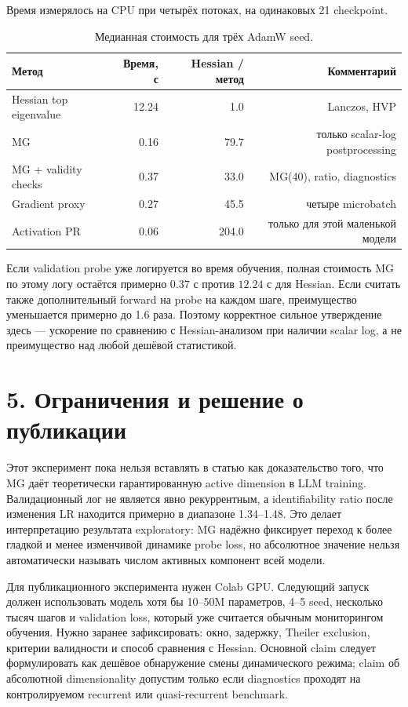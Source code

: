 \documentclass[10pt,a4paper]{article}
\begin{document}
Время измерялось на CPU при четырёх потоках, на одинаковых 21 checkpoint.

\begin{table}[h]
\centering\small
\caption{Медианная стоимость для трёх AdamW seed.}
\begin{tabular}{lrrr}
\toprule
Метод & Время, с & Hessian / метод & Комментарий \\
\midrule
Hessian top eigenvalue & 12.24 & 1.0 & Lanczos, HVP \\
MG & 0.16 & 79.7 & только scalar-log postprocessing \\
MG + validity checks & 0.37 & 33.0 & MG(40), ratio, diagnostics \\
Gradient proxy & 0.27 & 45.5 & четыре microbatch \\
Activation PR & 0.06 & 204.0 & только для этой маленькой модели \\
\bottomrule
\end{tabular}
\end{table}

Если validation probe уже логируется во время обучения, полная стоимость MG по этому
логу остаётся примерно $0.37$ с против $12.24$ с для Hessian. Если считать также
дополнительный forward на probe на каждом шаге, преимущество уменьшается примерно до
1.6 раза. Поэтому корректное сильное утверждение здесь --- ускорение по сравнению с
Hessian-анализом при наличии scalar log, а не преимущество над любой дешёвой статистикой.

\section*{5. Ограничения и решение о публикации}

Этот эксперимент пока нельзя вставлять в статью как доказательство того, что MG даёт
теоретически гарантированную active dimension в LLM training. Валидационный лог не
является явно рекуррентным, а identifiability ratio после изменения LR находится
примерно в диапазоне 1.34--1.48. Это делает интерпретацию результата exploratory:
MG надёжно фиксирует переход к более гладкой и менее изменчивой динамике probe loss,
но абсолютное значение нельзя автоматически называть числом активных компонент всей
модели.

Для публикационного эксперимента нужен Colab GPU. Следующий запуск должен использовать
модель хотя бы 10--50M параметров, 4--5 seed, несколько тысяч шагов и validation loss,
который уже считается обычным мониторингом обучения. Нужно заранее зафиксировать:
окно, задержку, Theiler exclusion, критерии валидности и способ сравнения с Hessian.
Основной claim следует формулировать как дешёвое обнаружение смены динамического режима;
claim об абсолютной dimensionality допустим только если diagnostics проходят на
контролируемом recurrent или quasi-recurrent benchmark.
\end{document}
